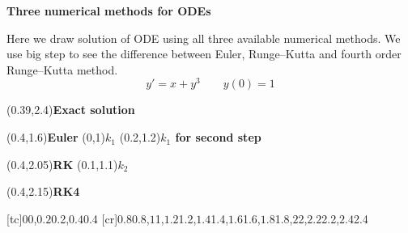 \bigskip
\centerline{\bf Three numerical methods for ODEs}

Here we draw solution of ODE using all three available numerical
methods. We use big step to see the difference between Euler,
Runge--Kutta and fourth order Runge--Kutta method.
$$    y'=x+y^3\qquad  y(0)=1
$$
  \leavevmode
    \pen{1pt}\tlabelsep{1pt}

    \nomplabels
    \tlabel[tr](0.39,2.4){\bf{Exact solution}}


    \tlabel[bl](0.4,1.6){\bf{Euler}}
    \tlabel[tl](0,1){\bf{$k_1$}}
    \tlabel[tl](0.2,1.2){\bf{$k_1$ for second step}}
    
    \tlabel[cl](0.4,2.05){\bf{RK}}
    \tlabel[tl](0.1,1.1){\bf{$k_2$}}
    
    \tlabel[tl](0.4,2.15){\bf{RK4}}
    
    \tlabelsep{3pt}

    \penwd{1pt}
    
    
    \pointfilltrue
    
    \pen{2pt}
    
    [tc]{{$0$}0,{$0.2$}0.2,{$0.4$}0.4}
    [cr]{{$0.8$}0.8,{$1$}1,{$1.2$}1.2,{$1.4$}1.4,{$1.6$}1.6,{$1.8$}1.8,{$2$}2,{$2.2$}2.2,{$2.4$}2.4}
  \endmfpic
  

